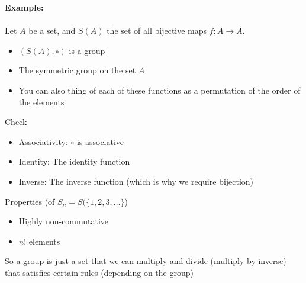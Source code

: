 \documentclass{article}
\begin{document}
\begin{example} 
\textbf{Example:}  \\
~\\
Let $A$ be a set, and $S(A)$ the set of all bijective maps $f: A\to A$. 
\begin{itemize}
	\item $(S(A),\circ)$ is a group
	\item The symmetric group on the set $A$
	\item You can also thing of each of these functions as a permutation of the order of the elements
\end{itemize}
Check
\begin{itemize}
	\item Associativity: $\circ$ is associative
	\item Identity: The identity function
	\item Inverse: The inverse function (which is why we require bijection)
\end{itemize}
Properties (of $S_n = S(\{1,2,3,\ldots\}$)
\begin{itemize}
	\item Highly non-commutative
	\item $n!$ elements
\end{itemize}
\end{example}
So a group is just a set that we can multiply and divide (multiply by inverse) that satisfies certain rules (depending on the group)
\end{document}
